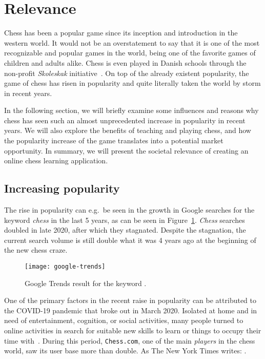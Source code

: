 \section{Relevance}\label{sec:relevance}

Chess has been a popular game since its inception and introduction in the western world.
It would not be an overstatement to say that it is one of the most recognizable and popular games in the world, being one
of the favorite games of children and adults alike.
Chess is even played in Danish schools through the non-profit \textit{Skoleskak} initiative~\cite{skoleskak2024}.
On top of the already existent popularity, the game of chess has risen in popularity and quite literally taken
the world by storm in recent years.

In the following section, we will briefly examine some influences and reasons why chess has seen such an almost
unprecedented increase in popularity in recent years.
We will also explore the benefits of teaching and playing chess, and how the popularity increase of the game translates
into a potential market opportunity.
In summary, we will present the societal relevance of creating an online chess learning application.

\subsection{Increasing popularity}\label{subsec:increasing-popularity}

The rise in popularity can e.g.\ be seen in the growth in Google searches for the keyword \textit{chess} in the last 5
years, as can be seen in Figure~\ref{fig:google-trends}.
\textit{Chess} searches doubled in late 2020, after which they stagnated.
Despite the stagnation, the current search volume is still double what it was 4 years ago at the beginning of the new
chess craze.

\begin{figure}
    \centering
    \texttt{[image: google-trends]}
    \caption{Google Trends result for the keyword .}\label{fig:google-trends}
\end{figure}

One of the primary factors in the recent raise in popularity can be attributed to the COVID-19 pandemic that broke out
in March 2020.
Isolated at home and in need of entertainment, cognition, or social activities, many people turned to online activities
in search for suitable new skills to learn or things to occupy their time with~\cite{nyt2022}.
During this period, \verb|Chess.com|, one of the main \textit{players} in the chess world, saw its user base more than
double.
As The New York Times writes: .

